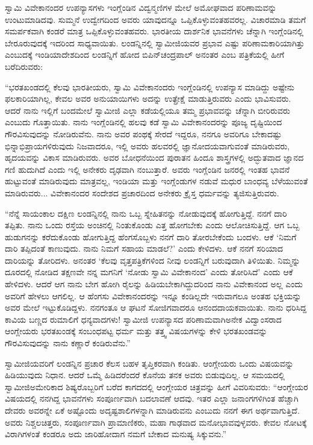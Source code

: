  ಸ್ವಾಮಿ ವಿವೇಕಾನಂದರ ಉಪನ್ಯಾಸಗಳು ಇಂಗ್ಲೆಂಡಿನ ವಿದ್ವನ್ಮಣಿಗಳ ಮೇಲೆ ಅಮೋಘವಾದ ಪರಿಣಾಮವನ್ನು ಉಂಟುಮಾಡಿದವು. ಸುಮ್ಮನೆ ಉದ್ವೇಗದಿಂದ ಅವರು ಯಾವುದನ್ನೂ ಒಪ್ಪಿಕೊಳ್ಳುವಂತಹವರಲ್ಲ. ವಿಚಾರಮಾಡಿ ತಮಗೆ ಸಮರ್ಪಕವಾಗಿ ಕಂಡರೆ ಮಾತ್ರ ಒಪ್ಪಿಕೊಳ್ಳುವಂತಹವರು. ಭಾರತೀಯ ದಾರ್ಶನಿಕ ಭಾವನೆಗಳು ಚೆನ್ನಾಗಿ ಇಂಗ್ಲೆಂಡಿನಲ್ಲಿ ಬೇರೂರುವುದಕ್ಕೆ ಇದರಿಂದ ಸಾಧ್ಯವಾಯಿತು. ಲಂಡನ್ನಿನಲ್ಲಿ ಸ್ವಾಮೀಜಿಯವರ ಪ್ರಭಾವ ಎಷ್ಟು ಪರಿಣಾಮಕಾರಿಯಾಗಿತ್ತು ಎಂಬುದಕ್ಕೆ ಇಂಡಿಯಾದೇಶದಿಂದ ಲಂಡನ್ನಿಗೆ ಹೋದ ಬಿಪಿನ್‌ಚಂದ್ರಪಾಲ್ ಅನಂತರ  ಎಂಬ ಪತ್ರಿಕೆಯಲ್ಲಿ ಹೀಗೆ ಬರೆದಿರುವರು: 

 “ಭರತಖಂಡದಲ್ಲಿ ಕೆಲವು ಭಾರತೀಯರು, ಸ್ವಾಮಿ ವಿವೇಕಾನಂದರು ಇಂಗ್ಲೆಂಡಿನಲ್ಲಿ ಉಪನ್ಯಾಸ ಮಾಡಿದ್ದು ಅಷ್ಟೇನು ಫಲಕಾರಿಯಾಗಿಲ್ಲ, ಕೇವಲ ಅವರ ಅನುಯಾಯಿಗಳು ಅದನ್ನು ಉತ್ಪ್ರೇಕ್ಷೆ ಮಾಡುತ್ತಿರುವರು ಎಂದು ಭಾವಿಸುವರು. ಆದರೆ ನಾನು ಇಲ್ಲಿಗೆ ಬಂದಮೇಲೆ ಸ್ವಾಮೀಜಿ ಎಲ್ಲಾ ಕಡೆಯಲ್ಲಿಯೂ ತಮ್ಮ ಪ್ರಭಾವವನ್ನು ಚೆನ್ನಾಗಿ ಬೀರಿರುವರು ಎಂಬುದು ಗೊತ್ತಾಯಿತು. ನಾನು ಇಂಗ್ಲೆಂಡಿನಲ್ಲಿ ಹಲವು ಕಡೆ ಸ್ವಾಮಿ ವಿವೇಕಾನಂದರನ್ನು ಪೂಜ್ಯ ದೃಷ್ಟಿಯಿಂದ ಗೌರವಿಸುವುದನ್ನು ನೋಡಿರುವೆನು. ನಾನು ಅವರ ಪಂಥಕ್ಕೆ ಸೇರದೆ ಇದ್ದರೂ, ನನಗೂ ಅವರಿಗೂ ಬೇಕಾದಷ್ಟು ಭಿನ್ನಾಭಿಪ್ರಾಯಗಳಿರುವುದು ನಿಜವಾದರೂ, ಇಲ್ಲಿ ಅವರು ಹಲವರಲ್ಲಿ ಜ್ಞಾನೋದಯವಾಗುವಂತೆ ಮಾಡಿರುವರು, ಹೃದಯವನ್ನು ವಿಕಾಸ ಮಾಡಿರುವರು. ಅವರ ಬೋಧನೆಯಿಂದ ಪುರಾತನ ಹಿಂದೂ ಶಾಸ್ತ್ರಗಳಲ್ಲಿ ಅದ್ಭುತವಾದ ಜ್ಞಾನದ ಗಣಿ ಹುದುಗಿದೆ ಎಂದು ಇಲ್ಲಿ ಅನೇಕರು ದೃಢವಾಗಿ ನಂಬುತ್ತಾರೆ. ಅವರು ಇಂಗ್ಲೆಂಡಿನ ಜನರಲ್ಲಿ ಇಂತಹ ಭಾವನೆ ಹುಟ್ಟುವಂತೆ ಮಾಡಿರುವುದು ಮಾತ್ರವಲ್ಲ, ಇಂಡಿಯಾ ಮತ್ತು ಇಂಗ್ಲೆಂಡುಗಳ ನಡುವೆ ಮಧುರ ಬಾಂಧವ್ಯ ಬೆಳೆಯುವಂತೆ ಮಾಡಿರುವರು... ವಿವೇಕಾನಂದರ ಸಂದೇಶದ ಪ್ರಚಾರದಿಂದ ಅನೇಕರು ಕ್ರೈಸ್ತ ಧರ್ಮವನ್ನು ತ್ಯಜಿಸುತ್ತಿರುವರು. 

\newpage

 “ನೆನ್ನೆ ಸಾಯಂಕಾಲ ದಕ್ಷಿಣ ಲಂಡನ್ನಿನಲ್ಲಿ ನಾನು ಒಬ್ಬ ಸ್ನೇಹಿತನನ್ನು ನೋಡುವುದಕ್ಕೆ ಹೋಗುತ್ತಿದ್ದೆ. ನನಗೆ ದಾರಿ ತಪ್ಪಿತು. ನಾನು ಒಂದು ರಸ್ತೆಯ ಅಂಚಿನಲ್ಲಿ ನಿಂತುಕೊಂಡು ಎತ್ತ ಹೋಗಬೇಕು ಎಂದು ಆಲೋಚಿಸುತ್ತಿದ್ದೆ. ಆಗ ಒಬ್ಬ ಹುಡುಗನನ್ನು ಕರೆದುಕೊಂಡು ಹೋಗುತ್ತಿದ್ದ ಹೆಂಗಸೊಬ್ಬಳು ನನಗೆ ದಾರಿ ತೋರಬೇಕೆಂದು ಬಂದಳು. ಆಕೆ ‘ನಿಮಗೆ ದಾರಿ ತಪ್ಪಿದಂತೆ ಕಾಣುವುದು. ನಾನು ನಿಮಗೆ ಸಹಾಯ ಮಾಡಲೆ?’ ಎಂದು ಕೇಳಿದಳು. ಆಕೆ ನನಗೆ ಸರಿಯಾದ ದಾರಿಯನ್ನು ತೋರಿದಳು. ಅನಂತರ ‘ಕೆಲವು ವೃತ್ತಪತ್ರಿಕೆಗಳಿಂದ ನೀವು ಲಂಡನ್ನಿಗೆ ಬರುವುದಾಗಿ ತಿಳಿಯಿತು. ನಿಮ್ಮನ್ನು ದೂರದಲ್ಲಿ ನೋಡಿದ ತಕ್ಷಣವೇ ನನ್ನ ಮಗನಿಗೆ ‘ನೋಡು ಸ್ವಾಮಿ ವಿವೇಕಾನಂದ’ ಎಂದು ತೋರಿಸಿದೆ’ ಎಂದು ಆಕೆ ಹೇಳಿದಳು. ಆದರೆ ಆಗ ನಾನು ಬೇಗ ಹೋಗಿ ರೈಲನ್ನು ಹಿಡಿಯಬೇಕಾಗಿದ್ದುದರಿಂದ ನಾನು ವಿವೇಕಾನಂದ ಅಲ್ಲ ಎಂದು ಅವರಿಗೆ ಹೇಳಲು ಆಗಲಿಲ್ಲ. ಆ ಹೆಂಗಸು ವಿವೇಕಾನಂದರನ್ನು ಇನ್ನೂ ಕಂಡಿಲ್ಲದೇ ಇರುವಾಗಲೂ ಅಂತಹ ಭಕ್ತಿಯನ್ನು ಅವರ ಮೇಲೆ ಇಟ್ಟುಕೊಡಿದ್ದಳು. ನನಗಂತೂ ಆ ಘಟನೆ ಸೋಜಿಗವಾದರೂ ಆನಂದದಾಯಕವಾಯಿತು. ನಾನು ಧರಿಸಿದ್ದ ಕಾವಿಯ ಬಣ್ಣದ ರುಮಾಲಿಗೆ ಧನ್ಯವಾದಗಳು! ಸ್ವಾಮೀಜಿ ಉಪನ್ಯಾಸದ ಪರಿಣಾಮವಾಗಿ\break ಅನೇಕ ವಿದ್ವಾಂಸರಾದ ಆಂಗ್ಲೇಯರು ಭರತಖಂಡಕ್ಕೆ ಸಂಬಂಧಪಟ್ಟ ಧರ್ಮ ಮತ್ತು ತತ್ತ್ವ ವಿಷಯಗಳನ್ನು ಕೇಳಿ ಭರತಖಂಡವನ್ನು ಗೌರವಿಸುವುದನ್ನು ನಾನು ಕಣ್ಣಾರೆ ಕಂಡಿರುವೆನು.” 

 ಸ್ವಾಮೀಜಿಯವರಿಗೆ ಲಂಡನ್ನಿನ ಪ್ರಚಾರ ಕೆಲಸ ಬಹಳ ತೃಪ್ತಿಕರವಾಗಿ ಕಂಡಿತು. ಆಂಗ್ಲೇಯರು ಒಂದು ವಿಷಯವನ್ನು ಹಿಡಿಯುವುದು ನಿಧಾನ. ಆದರೆ ಒಮ್ಮೆ ಹಿಡಿದರೆಂದರೆ ಕೊನೆಯ ತನಕ ಅವರು ಬಿಡುವುದಿಲ್ಲ. ಆ ಸಮಯದಲ್ಲಿ ಸ್ವಾಮೀಜಿ\break ಅಮೇರಿಕಾದ ಶಿಷ್ಯರೊಬ್ಬರಿಗೆ ಬರೆದ ಕಾಗದದಲ್ಲಿ ಆಂಗ್ಲೇಯರ ಚಿತ್ರವನ್ನು ಹೀಗೆ ವಿವರಿಸುವರು: “ಆಂಗ್ಲೇಯರ ವಿಷಯದಲ್ಲಿ ನನಗಿದ್ದ ಭಾವನೆಗಳು ಸಂಪೂರ್ಣವಾಗಿ ಬದಲಾವಣೆ ಆದವು. ಇತರ ಎಲ್ಲಾ ಜನಾಂಗಗಳಿಗಿಂತ ಹೆಚ್ಚಾಗಿ ದೇವರು ಅವರನ್ನೇ ಏಕೆ ಅಷ್ಟೊಂದು ಅದೃಷ್ಟಶಾಲಿಗಳನ್ನಾಗಿ ಮಾಡಿರುವನು ಎಂಬುದು ನನಗೆ ಈಗ ಅರ್ಥವಾಗುತ್ತಿದೆ. ಅವರು ನಿಶ್ಚಲಚಿತ್ತರು, ಸಂಪೂರ್ಣವಾಗಿ ಪ್ರಾಮಾಣಿಕರು, ಮಹಾ ಗಾಢವಾದ ಮನೋಭಾವವುಳ್ಳವರು. ಕೇವಲ ನೋಟಕ್ಕೆ ವಿರಾಗಿಗಳಂತೆ ಕಂಡರೂ ಅದು ಜಾರಿಹೋದಾಗ ನಮಗೆ ಬೇಕಾದ ಮನುಷ್ಯ ಸಿಕ್ಕುವನು.” 

